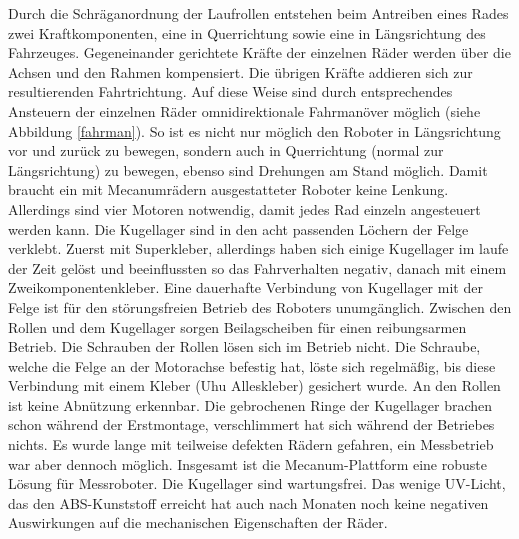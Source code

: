 \documentclass[a4paper,bibtotoc,oneside]{scrbook}
\begin{document}
Durch die Schräganordnung der Laufrollen entstehen beim Antreiben eines Rades zwei Kraftkomponenten, eine in Querrichtung sowie eine in Längsrichtung des Fahrzeuges. Gegeneinander gerichtete Kräfte der einzelnen Räder werden über die Achsen und den Rahmen kompensiert. Die übrigen Kräfte addieren sich zur resultierenden Fahrtrichtung. Auf diese Weise sind durch entsprechendes Ansteuern der einzelnen Räder omnidirektionale Fahrmanöver möglich (siehe Abbildung \ref{fahrman}). So ist es nicht nur möglich den Roboter in Längsrichtung vor und zurück zu bewegen, sondern auch in Querrichtung (normal zur Längsrichtung) zu bewegen, ebenso sind Drehungen am Stand möglich. Damit braucht ein mit Mecanumrädern ausgestatteter Roboter keine Lenkung. Allerdings sind vier Motoren notwendig, damit jedes Rad einzeln angesteuert werden kann.   
Die Kugellager sind in den acht passenden Löchern der Felge verklebt. Zuerst mit Superkleber, allerdings haben sich einige Kugellager im laufe der Zeit gelöst und beeinflussten so das Fahrverhalten negativ, danach mit einem Zweikomponentenkleber. Eine dauerhafte Verbindung von Kugellager mit der Felge ist für den störungsfreien Betrieb des Roboters unumgänglich. 
Zwischen den Rollen und dem Kugellager sorgen Beilagscheiben für einen reibungsarmen Betrieb. 
Die Schrauben der Rollen lösen sich im Betrieb nicht. Die Schraube, welche die Felge an der Motorachse befestig hat, löste sich regelmäßig, bis diese Verbindung mit einem Kleber (Uhu Alleskleber) gesichert wurde.
An den Rollen ist keine Abnützung erkennbar. Die gebrochenen Ringe der Kugellager brachen schon während der Erstmontage, verschlimmert hat sich während der Betriebes nichts.
Es wurde lange mit teilweise defekten Rädern gefahren, ein Messbetrieb war aber dennoch möglich. Insgesamt ist die Mecanum-Plattform eine robuste Lösung für Messroboter.
Die Kugellager sind wartungsfrei. Das wenige UV-Licht, das den ABS-Kunststoff erreicht hat auch nach Monaten noch keine negativen Auswirkungen auf die mechanischen Eigenschaften der Räder.
\end{document}
